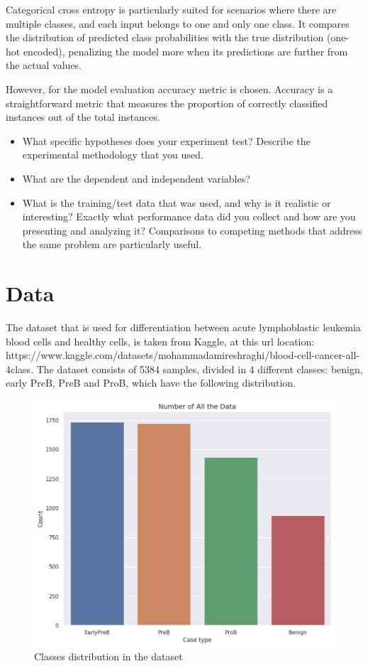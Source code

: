 \documentclass[runningheads,a4paper,11pt]{report}
\begin{document}
Categorical cross entropy is particularly suited for scenarios where there are multiple classes, and each input belongs to one and only one class. It compares the distribution of predicted class probabilities with the true distribution (one-hot encoded), penalizing the model more when its predictions are further from the actual values.

However, for the model evaluation accuracy metric is chosen. Accuracy is a straightforward metric that measures the proportion of correctly classified instances out of the total instances. 

\begin{itemize}
	\item What specific hypotheses does your experiment test? Describe the experimental methodology that you used. 
	\item What are the dependent and independent variables? 
	\item What is the training/test data that was used, and why is it realistic or interesting? Exactly what performance data did you collect and how are you presenting and analyzing it? Comparisons to competing methods that address the same problem are particularly useful.
\end{itemize}

\section{Data}
\label{section:data}
The dataset that is used for differentiation between acute lymphoblastic leukemia blood cells and healthy cells, is taken from Kaggle, at this url location: https://www.kaggle.com/datasets/mohammadamireshraghi/blood-cell-cancer-all-4class. 
The dataset consists of 5384 samples, divided in 4 different classes: benign, early PreB, PreB and ProB, which have the following distribution.

\begin{figure}[h]
    \centering
    \includegraphics[scale=0.25]{images/classes_distribution.png} 
    \caption{Classes distribution in the dataset}
\end{figure}
\end{document}
